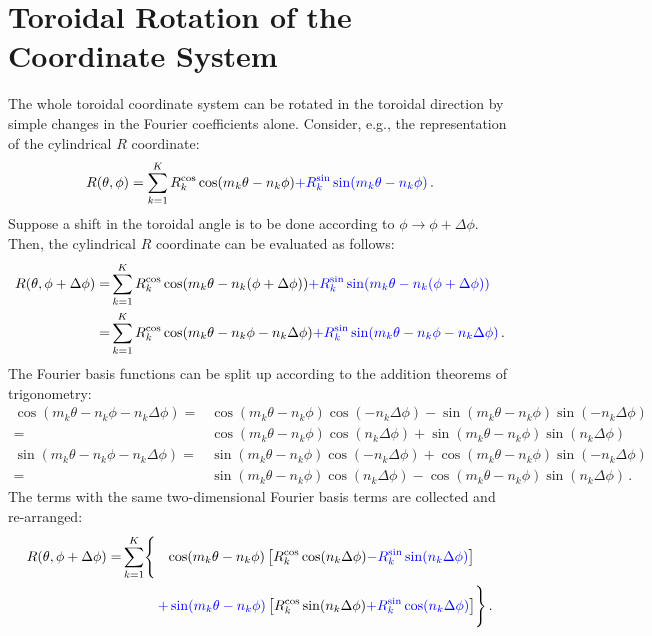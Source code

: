 \FloatBarrier
\section{Toroidal Rotation of the Coordinate System}
The whole toroidal coordinate system can be rotated in the toroidal direction by simple changes in the Fourier coefficients alone.
Consider, e.g., the representation of the cylindrical $R$ coordinate:
\begin{equation}
  R(\theta, \phi) = \sum_{k=1}^{K}   R_k^\mathrm{cos} \cos(m_k \theta - n_k \phi)
                     {\color{blue} + R_k^\mathrm{sin} \sin(m_k \theta - n_k \phi) } \, .
\end{equation}
Suppose a shift in the toroidal angle is to be done according to $\phi \rightarrow \phi + \Delta \phi$.
Then, the cylindrical $R$ coordinate can be evaluated as follows:
\begin{align}
 R(\theta, \phi + \Delta \phi) =& \sum_{k=1}^{K}   R_k^\mathrm{cos} \cos(m_k \theta - n_k (\phi +     \Delta \phi))
                                   {\color{blue} + R_k^\mathrm{sin} \sin(m_k \theta - n_k (\phi +     \Delta \phi)) } \nonumber \\
                               =& \sum_{k=1}^{K}   R_k^\mathrm{cos} \cos(m_k \theta - n_k  \phi - n_k \Delta \phi)
                                   {\color{blue} + R_k^\mathrm{sin} \sin(m_k \theta - n_k  \phi - n_k \Delta \phi) } \, .
\end{align}
The Fourier basis functions can be split up according to the addition theorems of trigonometry:
\begin{align}
    \cos(m_k \theta - n_k  \phi - n_k \Delta \phi)
 =& \cos(m_k \theta - n_k  \phi) \cos(- n_k \Delta \phi) - \sin(m_k \theta - n_k  \phi) \sin(- n_k \Delta \phi) \nonumber \\
 =& \cos(m_k \theta - n_k  \phi) \cos(  n_k \Delta \phi) + \sin(m_k \theta - n_k  \phi) \sin(  n_k \Delta \phi) \\
    \sin(m_k \theta - n_k  \phi - n_k \Delta \phi)
 =& \sin(m_k \theta - n_k  \phi) \cos(- n_k \Delta \phi) + \cos(m_k \theta - n_k  \phi) \sin(- n_k \Delta \phi) \nonumber \\
 =& \sin(m_k \theta - n_k  \phi) \cos(  n_k \Delta \phi) - \cos(m_k \theta - n_k  \phi) \sin(  n_k \Delta \phi) \, .
\end{align}
The terms with the same two-dimensional Fourier basis terms are collected and re-arranged:
\begin{align}
  R(\theta, \phi + \Delta \phi)
 =&          \sum_{k=1}^{K} \Biggl\{          \phantom{+} \cos(m_k \theta - n_k \phi)   \left[                 R_k^\mathrm{cos} \cos(n_k \Delta \phi)
                                                                                               {\color{blue} - R_k^\mathrm{sin} \sin(n_k \Delta \phi) } \right] \nonumber \\
 ~& \phantom{\sum_{k=1}^{K} \Biggl\{ } ~ {\color{blue} +  \sin(m_k \theta - n_k \phi) } \left[                 R_k^\mathrm{cos} \sin(n_k \Delta \phi)
                                                                                               {\color{blue} + R_k^\mathrm{sin} \cos(n_k \Delta \phi) } \right] \Biggr\} \, .
\end{align}
